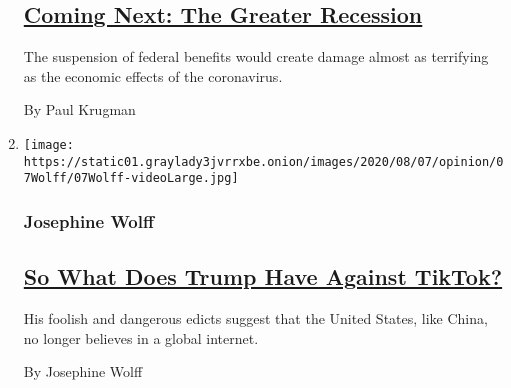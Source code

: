 \begin{enumerate}
  \hypertarget{coming-next-the-greater-recession}{%
  \subsection{\texorpdfstring{\href{/2020/08/06/opinion/coronavirus-us-recession.html}{Coming
  Next: The Greater
  Recession}}{Coming Next: The Greater Recession}}\label{coming-next-the-greater-recession}}

  The suspension of federal benefits would create damage almost as
  terrifying as the economic effects of the coronavirus.

  By Paul Krugman
\item
  \texttt{[image: https://static01.graylady3jvrrxbe.onion/images/2020/08/07/opinion/07Wolff/07Wolff-videoLarge.jpg]}

  \hypertarget{josephine-wolff}{%
  \subsubsection{Josephine Wolff}\label{josephine-wolff}}

  \hypertarget{so-what-does-trump-have-against-tiktok}{%
  \subsection{\texorpdfstring{\href{/2020/08/07/opinion/tiktok-wechat-china-trump-executive-order.html}{So
  What Does Trump Have Against
  TikTok?}}{So What Does Trump Have Against TikTok?}}\label{so-what-does-trump-have-against-tiktok}}

  His foolish and dangerous edicts suggest that the United States, like
  China, no longer believes in a global internet.

  By Josephine Wolff
\end{enumerate}

